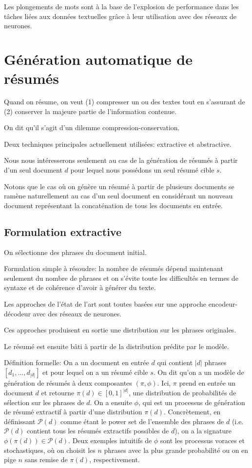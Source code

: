 Les plongements de mots sont à la base de l'explosion de performance dans les
tâches liées aux données textuelles grâce à leur utilisation avec des réseaux de
neurones.

\section{Génération automatique de résumés}

Quand on résume, on veut (1) compresser un ou des textes tout en
s'assurant de (2) conserver la majeure partie de l'information contenue.

On dit qu'il s'agit d'un dilemme compression-conservation.

Deux techniques principales actuellement utilisées: extractive et abstractive.

Nous nous intéresserons seulement au cas de la génération de résumés à partir
d'un seul document $d$ pour lequel nous possédons un seul résumé cible $s$.

Notons que le cas où on génère un résumé à partir de plusieurs documents se ramène
naturellement au cas d'un seul document en considérant un nouveau document
représentant la concaténation de tous les documents en entrée.

\subsection{Formulation extractive}
\label{sec:extractive}

On sélectionne des phrases du document initial.

Formulation simple à résoudre: la nombre de résumés dépend maintenant seulement du nombre
de phrases et on s'évite toute les difficultés en termes de syntaxe et de cohérence
d'avoir à générer du texte.

Les approches de l'état de l'art sont toutes basées sur une approche
encodeur-décodeur avec des réseaux de neurones.

Ces approches produisent en sortie une distribution sur les phrases
originales.

Le résumé est ensuite bâti à partir de la distribution prédite par le modèle.

Définition formelle: On a un document en entrée $d$ qui contient $|d|$ phrases $[d_1, ..., d_{|d|}]$
et pour lequel on a un résumé cible $s$.
On dit qu'on a un modèle de génération de résumés à deux composantes $(\pi, \phi)$.
Ici, $\pi$ prend en entrée un document $d$ et retourne
$\pi(d) \in [0, 1]^{|d|}$, une distribution de probabilités de sélection sur les phrases
de $d$.
On a ensuite $\phi$, qui est un processus de génération de résumé
extractif à partir d'une distribution $\pi(d)$.
Concrètement, en définissant $\mathscr{P}(d)$ comme étant le power set de l'ensemble
des phrases de $d$ (i.e. $\mathscr{P}(d)$ contient tous les résumés extractifs possibles
de $d$), on a la signature $\phi(\pi(d)) \in \mathscr{P}(d)$.
Deux exemples intuitifs de $\phi$ sont les processus voraces et stochastiques,
où on choisit les $n$ phrases avec la plus grande probabilité ou on en pige
$n$ sans remise de $\pi(d)$, respectivement.


